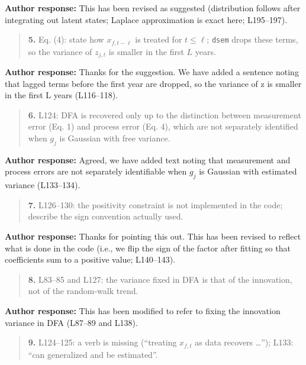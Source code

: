 \documentclass[11pt]{article}
\begin{document}
\textbf{Author response:} This has been revised as suggested
(distribution follows after integrating out latent states; Laplace
approximation is exact here; L195--197).

\begin{quote}
\textbf{5.} Eq. (4): state how \(x_{f,t-\ell}\) is treated for
\(t \le \ell\); \texttt{dsem} drops these terms, so the variance of
\(z_{j,t}\) is smaller in the first \(L\) years.
\end{quote}

\textbf{Author response:} Thanks for the suggestion. We have added a
sentence noting that lagged terms before the first year are dropped, so
the variance of z is smaller in the first L years (L116--118).

\begin{quote}
\textbf{6.} L124: DFA is recovered only up to the distinction between
measurement error (Eq. 1) and process error (Eq. 4), which are not
separately identified when \(g_j\) is Gaussian with free variance.
\end{quote}

\textbf{Author response:} Agreed, we have added text noting that
measurement and process errors are not separately identifiable when
\(g_j\) is Gaussian with estimated variance (L133--134).

\begin{quote}
\textbf{7.} L126--130: the positivity constraint is not implemented in
the code; describe the sign convention actually used.
\end{quote}

\textbf{Author response:} Thanks for pointing this out. This has been
revised to reflect what is done in the code (i.e., we flip the sign of
the factor after fitting so that coefficients sum to a positive value;
L140--143).

\begin{quote}
\textbf{8.} L83--85 and L127: the variance fixed in DFA is that of the
innovation, not of the random-walk trend.
\end{quote}

\textbf{Author response:} This has been modified to refer to fixing the
innovation variance in DFA (L87--89 and L138).

\begin{quote}
\textbf{9.} L124--125: a verb is missing (``treating \(x_{f,t}\) as data
recovers \ldots{}''); L133: ``can generalized and be estimated''.
\end{quote}
\end{document}
